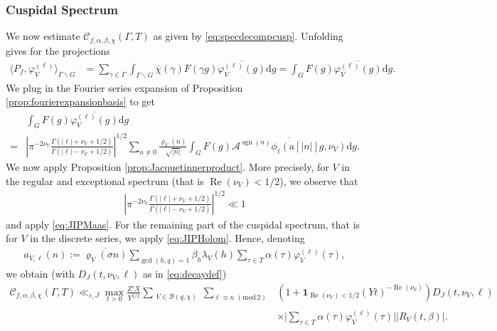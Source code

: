 \documentclass[12pt]{amsart}
\theoremstyle{definition}
\theoremstyle{remark}
\numberwithin{equation}{section}
\newcommand{\1}{{\mathbf 1}}
\newcommand{\eps}{\varepsilon}
\renewcommand{\Re}{\operatorname{Re}}
\renewcommand{\d}{\mathrm d}
\newcommand{\sgn}{\operatorname{sgn}}
\renewcommand{\pmod}[1]{\,\,(\mathrm{mod}\,{#1})}
\begin{document}
\subsubsection{Cuspidal Spectrum}
We now estimate $\mathcal{C}_{f,\alpha,\beta,\chi}(\Gamma,T)$ as given by \eqref{eq:specdecompcusp}. Unfolding gives for the projections
\begin{align*}
    \langle P_{f} ,\varphi_V^{(\ell)} \rangle_{\Gamma \backslash G} &=\sum_{\gamma \in \Gamma} \int_{\Gamma \backslash G} \overline{\chi}(\gamma) F(\gamma g) \overline{\varphi_V^{(\ell)}(g)}  \d g =\int_{G} F( g) \overline{\varphi_V^{(\ell)}(g)}  \d g.
\end{align*}
We plug in the Fourier series expansion of Proposition \ref{prop:fourierexpansionbasis} to get
\begin{align*}
    &\int_{G} F( g) \overline{\varphi_V^{(\ell)}(g)}  \d g\\
    =&\left|\pi^{-2\nu_V}\frac{\Gamma(|\ell|+\nu_V+1/2)}{\Gamma(|\ell|-\nu_V+1/2)} \right|^{1/2}\sum_{n\neq 0} \frac{\overline{\varrho_V(n)}}{\sqrt{|n|}}  \int_{G} F( g)  \overline{\mathcal{A}^{\sgn(n)}\phi_{\ell}(\mathrm{a}[|n|]g,\nu_V)}\d g.
\end{align*}
We now apply Proposition \ref{prop:Jacquetinnerproduct}. More precisely, for $V$ in the regular and exceptional spectrum (that is $\Re(\nu_V)<1/2$), we observe that 
\begin{align*}
\left|\pi^{-2\nu_V}\frac{\Gamma(|\ell|+\nu_V+1/2)}{\Gamma(|\ell|-\nu_V+1/2)} \right|^{1/2}\ll 1
\end{align*}
and apply \eqref{eq:JIPMaas}. For the remaining part of the cuspidal spectrum, that is for $V$ in the discrete series, we apply \eqref{eq:JIPHolom}. Hence, denoting
\begin{align*}
    a_{V,\ell}(  n) :=  \overline{\varrho_V(\sigma n)} \sum_{\gcd(h,q)=1} \beta_h \lambda_V(h) \sum_{\tau \in T} \alpha(\tau) \varphi_V^{(\ell)}(\tau),
\end{align*}
we obtain (with $D_J(t,\nu_V,\ell)$ as in \eqref{eq:decaydef})
\begin{align*}
\mathcal{C}_{f,\alpha,\beta,\chi}(\Gamma,T)   \ll_{\eps,J}     \max_{t>0}  \frac{Z^\eps X}{Y^{1/2}} \sum_{\substack{V\in \mathcal{B}(q,\chi) \\  }} \sum_{\ell \equiv \kappa \pmod{2}} &(1+\mathbf{1}_{\Re(\nu_V) < 1/2}(  Yt  )^{- \Re(\nu_V)} ) D_J(t,\nu_V,\ell)
\\ & \times \bigg| \sum_{\tau \in T} \alpha(\tau) \varphi_V^{(\ell)}(\tau)\bigg| |R_V(t,\beta)|.
\end{align*}
\end{document}
